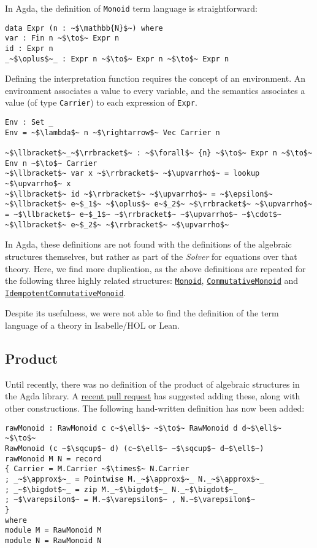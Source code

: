 In Agda, the definition of \lstinline|Monoid| term language is straightforward:
\begin{verbatim}
data Expr (n : ~$\mathbb{N}$~) where 
var : Fin n ~$\to$~ Expr n 
id : Expr n 
_~$\oplus$~_ : Expr n ~$\to$~ Expr n ~$\to$~ Expr n 
\end{verbatim}
Defining the interpretation function requires the concept of an environment.
An environment associates a value to every variable, and the semantics
associates a value (of type \verb|Carrier|) to each expression of \verb|Expr|.
\begin{verbatim}
Env : Set _ 
Env = ~$\lambda$~ n ~$\rightarrow$~ Vec Carrier n 

~$\llbracket$~_~$\rrbracket$~ : ~$\forall$~ {n} ~$\to$~ Expr n ~$\to$~ Env n ~$\to$~ Carrier 
~$\llbracket$~ var x ~$\rrbracket$~ ~$\upvarrho$~ = lookup ~$\upvarrho$~ x 
~$\llbracket$~ id ~$\rrbracket$~ ~$\upvarrho$~ = ~$\epsilon$~ 
~$\llbracket$~ e~$_1$~ ~$\oplus$~ e~$_2$~ ~$\rrbracket$~ ~$\upvarrho$~ = ~$\llbracket$~ e~$_1$~ ~$\rrbracket$~ ~$\upvarrho$~ ~$\cdot$~ ~$\llbracket$~ e~$_2$~ ~$\rrbracket$~ ~$\upvarrho$~ 
\end{verbatim}


In Agda, these definitions are not found with the definitions of the
algebraic structures themselves, but rather as part of the
\emph{Solver} for equations over that theory. Here, we find more
duplication, as the above definitions
are repeated for the following three highly related structures: 
\href{https://github.com/agda/agda-stdlib/blob/4a8d8f5ffbdbd967ca1bb708895ea63709e0063d/src/Algebra/Solver/Monoid.agda}
{\lstinline|Monoid|},
\href{https://github.com/agda/agda-stdlib/blob/4a8d8f5ffbdbd967ca1bb708895ea63709e0063d/src/Algebra/Solver/CommutativeMonoid.agda}
{\lstinline|CommutativeMonoid|}
and 
\href{https://github.com/agda/agda-stdlib/blob/4a8d8f5ffbdbd967ca1bb708895ea63709e0063d/src/Algebra/Solver/IdempotentCommutativeMonoid.agda}
{\lstinline|IdempotentCommutativeMonoid|}.

Despite its usefulness, we were not able to find the definition of the term
language of a theory in Isabelle/HOL or Lean.  

\subsection{Product}
Until recently, there was no definition of the product of algebraic
structures in the Agda library.  A 
\href{https://github.com/agda/agda-stdlib/pull/1109}{recent pull request}
has suggested adding these, along with other constructions.  The
following hand-written definition has now been added:
\begin{verbatim}
rawMonoid : RawMonoid c c~$\ell$~ ~$\to$~ RawMonoid d d~$\ell$~ ~$\to$~ 
RawMonoid (c ~$\sqcup$~ d) (c~$\ell$~ ~$\sqcup$~ d~$\ell$~)
rawMonoid M N = record
{ Carrier = M.Carrier ~$\times$~ N.Carrier
; _~$\approx$~_ = Pointwise M._~$\approx$~_ N._~$\approx$~_
; _~$\bigdot$~_ = zip M._~$\bigdot$~_ N._~$\bigdot$~_
; ~$\varepsilon$~ = M.~$\varepsilon$~ , N.~$\varepsilon$~
}
where
module M = RawMonoid M
module N = RawMonoid N
\end{verbatim}

